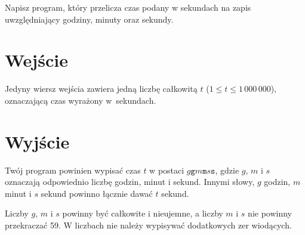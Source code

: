 \documentclass{spiral-kurs}
\begin{document}
\makeheader
%
Napisz program, który przelicza czas podany w sekundach na zapis uwzględniający
godziny, minuty oraz sekundy.

\section{Wejście}
Jedyny wiersz wejścia zawiera jedną liczbę całkowitą $t$ ($1 \le t \le 1\,000\,000$),
oznaczającą czas wyrażony w~sekundach.

\section{Wyjście}
Twój program powinien wypisać czas $t$ w postaci $g\mathtt{g}m\mathtt{m}s\mathtt{s}$, gdzie $g$, $m$ i $s$
oznaczają odpowiednio liczbę godzin, minut i sekund.
Innymi słowy, $g$ godzin, $m$ minut i $s$ sekund powinno łącznie dawać $t$ sekund.

Liczby $g$, $m$ i $s$ powinny być całkowite i nieujemne, a liczby $m$ i $s$ nie powinny przekraczać 59.
W liczbach nie należy wypisywać dodatkowych zer wiodących.

\end{document}
